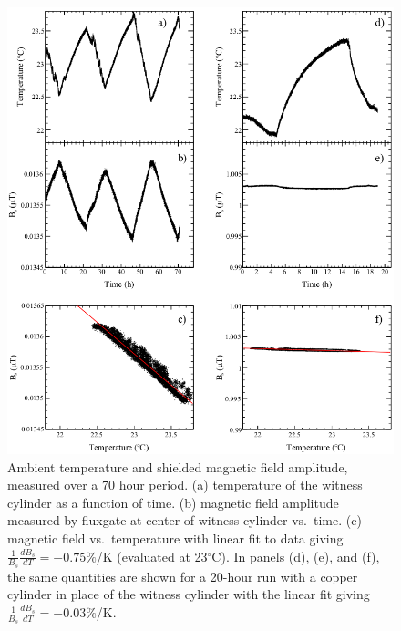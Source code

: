 \begin{figure}
  \begin{center}
    \includegraphics[width=\textwidth]{fig3.png}
    \caption{Ambient temperature and shielded magnetic field
      amplitude, measured over a 70 hour period. (a) temperature of
      the witness cylinder as a function of time.  (b) magnetic field
      amplitude measured by fluxgate at center of witness cylinder
      vs.~time.  (c) magnetic field vs.~temperature with linear fit to
      data giving $\frac{1}{B_s}\frac{dB_s}{dT}=-0.75\%$/K (evaluated
      at 23$^\circ$C).  In panels (d), (e), and (f), the same
      quantities are shown for a 20-hour run with a copper cylinder in
      place of the witness cylinder with the linear fit giving
      $\frac{1}{B_s}\frac{dB_s}{dT}=-0.03\%$/K.}
    \label{fig:B_vs_Temp}
  \end{center}
\end{figure} 

